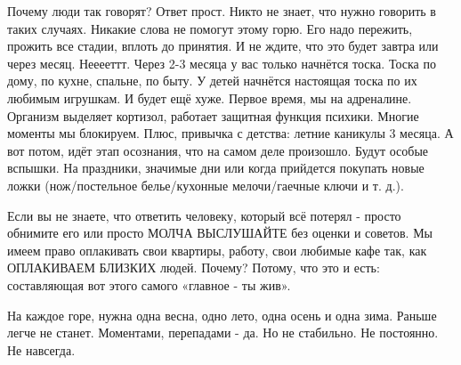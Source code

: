 Почему люди так говорят? Ответ прост. Никто не знает, что нужно говорить в
таких случаях. Никакие слова не помогут этому горю. Его надо пережить, прожить
все стадии, вплоть до принятия. И не ждите, что это будет завтра или через
месяц. Нееееттт.  Через 2-3 месяца у вас только начнётся тоска. Тоска по дому,
по кухне, спальне, по быту. У детей начнётся настоящая тоска по их любимым
игрушкам. И будет ещё хуже. Первое время, мы на адреналине. Организм выделяет
кортизол, работает защитная функция психики. Многие моменты мы блокируем. Плюс,
привычка с детства: летние каникулы 3 месяца. А вот потом, идёт этап осознания,
что на самом деле произошло. Будут особые вспышки. На праздники, значимые дни
или когда прийдется покупать новые ложки (нож/постельное белье/кухонные
мелочи/гаечные ключи и т. д.). 

Если вы не знаете, что ответить человеку, который всё потерял  - просто
обнимите его или просто МОЛЧА ВЫСЛУШАЙТЕ без оценки и советов. Мы имеем право
оплакивать свои квартиры, работу, свои любимые кафе так, как ОПЛАКИВАЕМ БЛИЗКИХ
людей. Почему? Потому, что это и есть: составляющая вот этого самого «главное -
ты жив».

На каждое горе, нужна одна весна, одно лето, одна осень и одна зима. Раньше
легче не станет.  Моментами, перепадами - да. Но не стабильно. Не постоянно. Не
навсегда.
